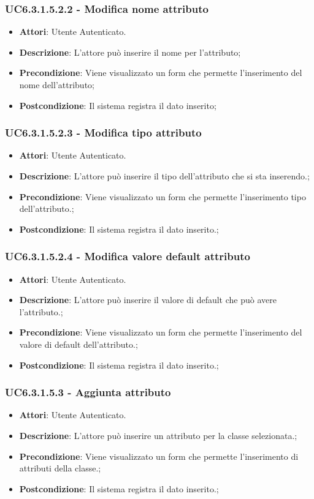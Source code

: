 \subsubsection{UC6.3.1.5.2.2 - Modifica nome attributo} 
\label{sssec:UC6.3.1.5.2.2} 
\begin{itemize} 
\item \textbf{Attori}: Utente Autenticato.
\item \textbf{Descrizione}: L'attore può inserire il nome per l'attributo;
\item \textbf{Precondizione}: Viene visualizzato un form che permette l'inserimento del nome dell'attributo;
\item \textbf{Postcondizione}: Il sistema registra il dato inserito;
\end{itemize} 
\subsubsection{UC6.3.1.5.2.3 - Modifica tipo attributo} 
\label{sssec:UC6.3.1.5.2.3} 
\begin{itemize} 
\item \textbf{Attori}: Utente Autenticato.
\item \textbf{Descrizione}: L'attore può inserire il tipo dell'attributo che si sta inserendo.;
\item \textbf{Precondizione}: Viene visualizzato un form che permette l'inserimento tipo dell'attributo.;
\item \textbf{Postcondizione}: Il sistema registra il dato inserito.;
\end{itemize} 
\subsubsection{UC6.3.1.5.2.4 - Modifica valore default attributo} 
\label{sssec:UC6.3.1.5.2.4} 
\begin{itemize} 
\item \textbf{Attori}: Utente Autenticato.
\item \textbf{Descrizione}: L'attore può inserire il valore di default che può avere l'attributo.;
\item \textbf{Precondizione}: Viene visualizzato un form che permette l'inserimento del valore di default dell'attributo.;
\item \textbf{Postcondizione}: Il sistema registra il dato inserito.;
\end{itemize} 
\subsubsection{UC6.3.1.5.3 - Aggiunta attributo} 
\label{sssec:UC6.3.1.5.3} 
\begin{itemize} 
\item \textbf{Attori}: Utente Autenticato.
\item \textbf{Descrizione}: L'attore può inserire un attributo per la classe selezionata.;
\item \textbf{Precondizione}: Viene visualizzato un form che permette l'inserimento di attributi della classe.;
\item \textbf{Postcondizione}: Il sistema registra il dato inserito.;
\end{itemize} 
